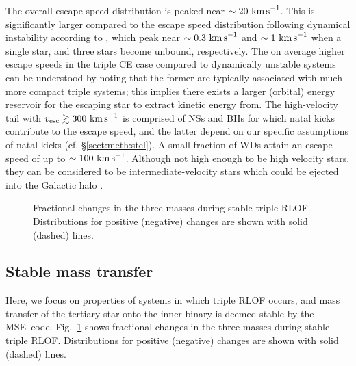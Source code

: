 \documentclass[twocolumn,appendixfloats,tighten]{aastex631}
\newcommand{\kms}{\, {\rm km\, s}^{-1}}
\newcommand{\F}{Fig.}
\newcommand{\mse}{\textsc{MSE}}
\begin{document}
The overall escape speed distribution is peaked near $\sim 20\,\kms$. This is significantly larger compared to the escape speed distribution following dynamical instability according to \citet{2021arXiv210713620H}, which peak near $\sim 0.3\,\kms$ and $\sim 1\,\kms$ when a single star, and three stars become unbound, respectively. The on average higher escape speeds in the triple CE case compared to dynamically unstable systems can be understood by noting that the former are typically associated with much more compact triple systems; this implies there exists a larger (orbital) energy reservoir for the escaping star to extract kinetic energy from. The high-velocity tail with $v_\mathrm{esc} \gtrsim 300\,\kms$ is comprised of NSs and BHs for which natal kicks contribute to the escape speed, and the latter depend on our specific assumptions of natal kicks (cf. \S\ref{sect:meth:stel}). A small fraction of WDs attain an escape speed of up to $\sim 100\,\kms$. Although not high enough to be high velocity stars, they can be considered to be intermediate-velocity stars which could be ejected into the Galactic halo \citep[e.g.,][]{2005ApJ...625..838B}.

\begin{figure}
\iftoggle{ApJFigs}{
\texttt{[image: TRLOF\_stable\_delta\_m1]}
\texttt{[image: TRLOF\_stable\_delta\_m2]}
\texttt{[image: TRLOF\_stable\_delta\_m3]}
}{
\texttt{[image: figs/TRLOF\_stable\_delta\_m1]}
\texttt{[image: figs/TRLOF\_stable\_delta\_m2]}
\texttt{[image: figs/TRLOF\_stable\_delta\_m3]}
}
\caption{Fractional changes in the three masses during stable triple RLOF. Distributions for positive (negative) changes are shown with solid (dashed) lines. }
\label{fig:stable_delta_m}
\end{figure}


\subsection{Stable mass transfer}
\label{sect:popsyn:stab}
Here, we focus on properties of systems in which triple RLOF occurs, and mass transfer of the tertiary star onto the inner binary is deemed stable by the \mse~code. \F~\ref{fig:stable_delta_m} shows fractional changes in the three masses during stable triple RLOF. Distributions for positive (negative) changes are shown with solid (dashed) lines.
\end{document}
